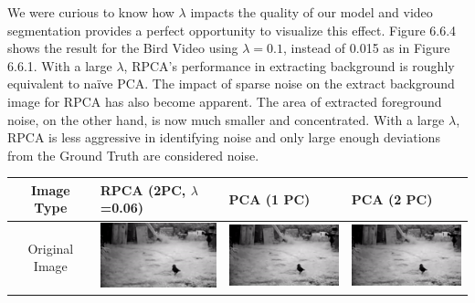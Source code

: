 \documentclass[11pt]{scrartcl} %
\theoremstyle{plain}
\begin{document}
We were curious to know how $\lambda$ impacts the quality of our model and video segmentation provides a perfect opportunity to visualize this effect. Figure 6.6.4 shows the result for the Bird Video using $\lambda = 0.1$, instead of 0.015 as in Figure 6.6.1. With a large $\lambda$, RPCA’s performance in extracting background is roughly equivalent to naïve PCA. The impact of sparse noise on the extract background image for RPCA has also become apparent. The area of extracted foreground noise, on the other hand, is now much smaller and concentrated. With a large $\lambda$, RPCA is less aggressive in identifying noise and only large enough deviations from the Ground Truth are considered noise.
\bigskip

\begin{minipage}{\linewidth}
\bgroup
  \begin{tabular}{ | c | m{2.8cm} | m{2.8cm} | m{2.8cm} | }
    \hline
    Image Type & RPCA \linebreak (2PC, $\lambda$=0.06) & PCA \linebreak (1 PC) & PCA \linebreak (2 PC)
    \\ \hline
	Original \linebreak Image
    &
    \begin{minipage}{.3\textwidth}
      \includegraphics[width=\linewidth, width=25mm]{figures_video/crow/original.png}
    \end{minipage}
    & 
    \begin{minipage}{.3\textwidth}
      \includegraphics[width=\linewidth, width=25mm]{figures_video/crow/original.png}
    \end{minipage}
    &
    \begin{minipage}{.3\textwidth}
      \includegraphics[width=\linewidth, width=25mm]{figures_video/crow/original.png}
    \end{minipage}
    \\ \hline

\end{tabular}
\end{minipage}
\end{document}
